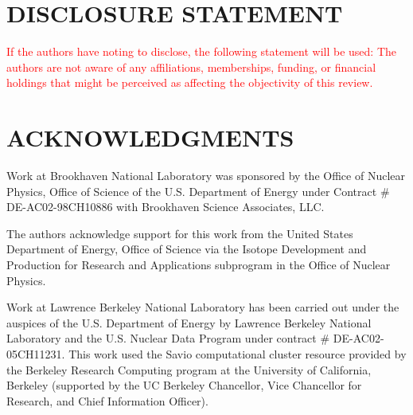 \documentclass[letterpaper]{ar-1col}
\newcommand{\textred}[1]{\textcolor{red}{ #1}}
\begin{document}
% 
% 

\section*{DISCLOSURE STATEMENT}
\textred{If the authors have noting to disclose, the following statement will be used: The authors are not aware of any affiliations, memberships, funding, or financial holdings that
might be perceived as affecting the objectivity of this review. }

\section*{ACKNOWLEDGMENTS}
Work at Brookhaven National Laboratory was sponsored by the Office of Nuclear Physics, Office of Science of the U.S. Department of Energy under Contract \# DE-AC02-98CH10886 with Brookhaven Science Associates, LLC.

The authors acknowledge support for this work from the United States Department of Energy, Office of Science via the Isotope Development and Production for Research and Applications subprogram in the Office of Nuclear Physics. 

Work at Lawrence Berkeley National Laboratory has been carried out  under the auspices of the U.S. Department of Energy by  Lawrence Berkeley National Laboratory and the U.S. Nuclear Data Program under contract \# DE-AC02-05CH11231. This work used the Savio computational cluster resource provided by the Berkeley Research Computing program at the University of California, Berkeley (supported by the UC Berkeley Chancellor, Vice Chancellor for Research, and Chief Information Officer).
\end{document}
